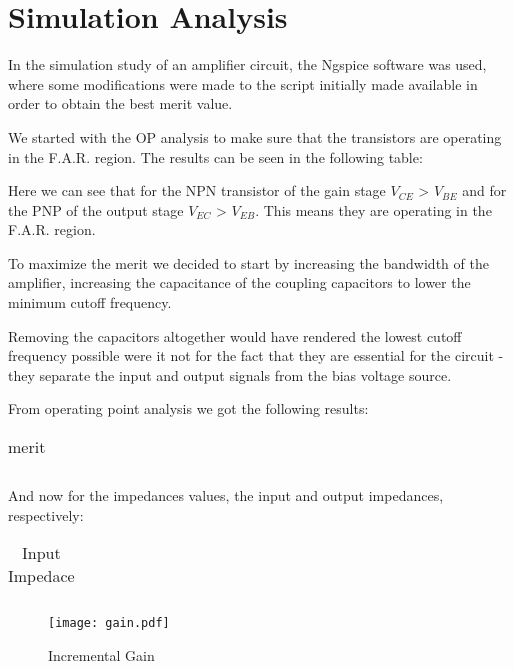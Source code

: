 \section{Simulation Analysis}
\label{sec:simulation} 

In the simulation study of an amplifier circuit, the Ngspice software was used, where some modifications were made to the script initially made available in order to obtain the best merit value.

We started with the OP analysis to make sure that the transistors are operating in the F.A.R. region. The results can be seen in the following table:

Here we can see that for the NPN transistor of the gain stage $V_{CE}$ > $V_{BE}$ and for the PNP of the output stage $V_{EC}$ > $V_{EB}$. This means they are operating in the F.A.R. region.

To maximize the merit we decided to start by increasing the bandwidth of the amplifier, increasing the capacitance of the coupling capacitors to lower the minimum cutoff frequency.

Removing the capacitors altogether would have rendered the lowest cutoff frequency possible were it not for the fact that they are essential for the circuit - they separate the input and output signals from the bias voltage source.


From operating point analysis we got the following results:
\FloatBarrier
\begin{table}[h]
  \centering
  \begin{tabular}{|c|c|c|c|c|}
    \hline    
    
    \hline
  \end{tabular}
  \caption{merit}
  \label{tab:Spice1}
\end{table}
\FloatBarrier  

And now for the impedances values, the input and output impedances, respectively:

\FloatBarrier
\begin{table}[h]
  \centering
  \begin{tabular}{|c|c|}
    \hline    
    
    \hline
  \end{tabular}
  \caption{Input Impedace}
  \label{tab:Spice1}
\end{table}
\FloatBarrier   

%    

\begin{figure} [!htb] 
  \texttt{[image: gain.pdf]}
  \caption{Incremental Gain}
  \label{fig:theoplots}
  \endminipage\hfill
\end{figure}



